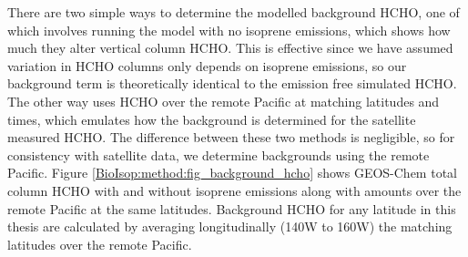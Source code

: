     
    There are two simple ways to determine the modelled background HCHO, one of which involves running the model with no isoprene emissions, which shows how much they alter vertical column HCHO.
    This is effective since we have assumed variation in HCHO columns only depends on isoprene emissions, so our background term is theoretically identical to the emission free simulated HCHO.
    The other way uses HCHO over the remote Pacific at matching latitudes and times, which emulates how the background is determined for the satellite measured HCHO.
    The difference between these two methods is negligible, so for consistency with satellite data, we determine backgrounds using the remote Pacific.
    Figure \ref{BioIsop:method:fig_background_hcho} shows GEOS-Chem total column HCHO with and without isoprene emissions along with amounts over the remote Pacific at the same latitudes.
    Background HCHO for any latitude in this thesis are calculated by averaging longitudinally (140\degr W to 160\degr W) the matching latitudes over the remote Pacific.
    
    
    
